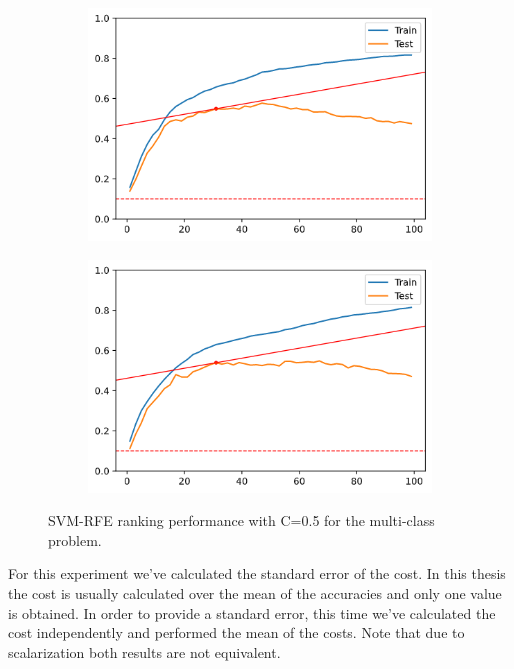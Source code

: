 \begin{figure}[h]
\begin{subfigure}[b]{0.4\linewidth}
        \includegraphics[width=\linewidth]{img/ch5/multi/w-l3.png}
    \end{subfigure}
    \begin{subfigure}[b]{0.4\linewidth}
        \includegraphics[width=\linewidth]{img/ch5/multi/w-coef.png}
    \end{subfigure}
    \caption{SVM-RFE ranking performance with C=0.5 for the multi-class problem.}
    \label{fig:ch5.multi.plot1}
\end{figure}

For this experiment we've calculated the standard error of the cost. In this thesis the cost is usually calculated over the mean of the accuracies and only one value is obtained. In order to provide a standard error, this time we've calculated the cost independently and performed the mean of the costs. Note that due to scalarization both results are not equivalent.

